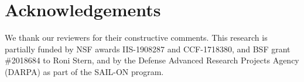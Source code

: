 \documentclass[letterpaper]{article} %
\begin{document}


\section*{Acknowledgements}
We thank our reviewers for their constructive comments.
This research is partially funded by NSF awards IIS-1908287 and CCF-1718380,
and BSF grant \#2018684 to Roni Stern, 
and by the Defense Advanced
Research Projects Agency (DARPA) as part of the SAIL-ON program. %



\end{document}
